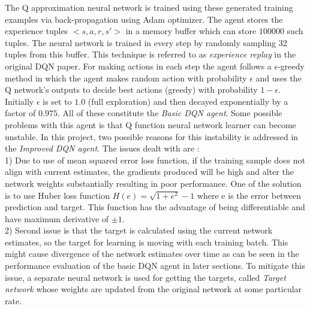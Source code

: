 \documentclass{article}
\begin{document}
The Q approximation neural network is trained using these generated training examples via back-propagation using Adam\cite{adam} optimizer. The agent stores the experience tuples $<s, a, r, s'>$ in a memory buffer which can store $100000$ such tuples. The neural network is trained in every step by randomly sampling 32 tuples from this buffer. This technique is referred to as \textit{experience replay} in the original DQN paper. For making actions in each step the agent follows a $\epsilon$-greedy method in which the agent makes random action with probability $\epsilon$ and uses the Q network's outputs to decide best actions (greedy) with probability $1-\epsilon$. Initially $\epsilon$ is set to $1.0$ (full exploration) and then decayed exponentially by a factor of $0.975$. All of these constitute the \textit{Basic DQN agent}. Some possible problems with this agent is that Q function neural network learner can become unstable. In this project, two possible reasons for this instability is addressed in the \textit{Improved DQN agent}. The issues dealt with are :\\1) Due to use of mean squared error loss function, if the training sample does not align with current estimates, the gradients produced will be high and alter the network weights substantially resulting in poor performance. One of the solution is to use Huber loss function $H(e) = \sqrt{1+e^2} - 1$ where e is the error between prediction and target. This function has the advantage of being differentiable and have maximum derivative of $\pm1$.\\2) Second issue is that the target is calculated using the current network estimates, so the target for learning is moving with each training batch. This might cause divergence of the network estimates over time as can be seen in the performance evaluation of the basic DQN agent in later sections. To mitigate this issue, a separate neural network is used for getting the targets, called \textit{Target network} whose weights are updated from the original network at some particular rate.\\
\vspace{5.0cm}
\end{document}
